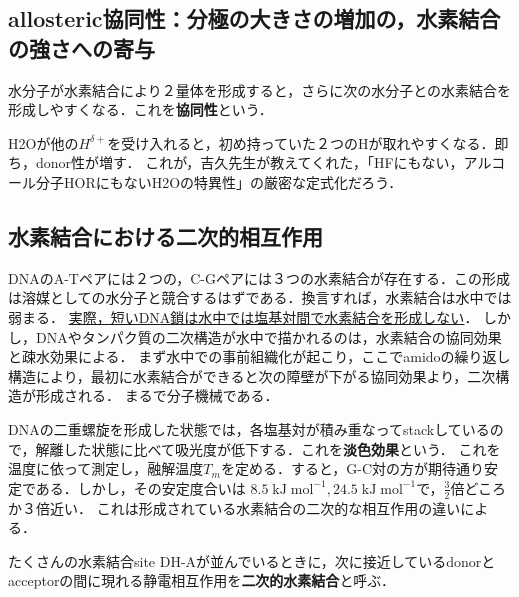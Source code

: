 \documentclass[uplatex, dvipdfmx]{jsreport}
\begin{document}
\subsection{allosteric協同性：分極の大きさの増加の，水素結合の強さへの寄与}

\begin{definition}[cooperaticity]
    水分子が水素結合により２量体を形成すると，さらに次の水分子との水素結合を形成しやすくなる．これを\textbf{協同性}という．
\end{definition}
\begin{remark}
    H2Oが他の$H^{\delta+}$を受け入れると，初め持っていた２つのHが取れやすくなる．即ち，donor性が増す．
    これが，吉久先生が教えてくれた，「HFにもない，アルコール分子HORにもないH2Oの特異性」の厳密な定式化だろう．
\end{remark}

\subsection{水素結合における二次的相互作用}

\begin{example}
    DNAのA-Tペアには２つの，C-Gペアには３つの水素結合が存在する．この形成は溶媒としての水分子と競合するはずである．換言すれば，水素結合は水中では弱まる．
    \underline{実際，短いDNA鎖は水中では塩基対間で水素結合を形成しない}．
    しかし，DNAやタンパク質の二次構造が水中で描かれるのは，水素結合の協同効果と疎水効果による．
    まず水中での事前組織化が起こり，ここでamidoの繰り返し構造により，最初に水素結合ができると次の障壁が下がる協同効果より，二次構造が形成される．
    まるで分子機械である．
\end{example}
\begin{method}
    DNAの二重螺旋を形成した状態では，各塩基対が積み重なってstackしているので，解離した状態に比べて吸光度が低下する．これを\textbf{淡色効果}という．
    これを温度に依って測定し，融解温度$T_m$を定める．すると，G-C対の方が期待通り安定である．しかし，その安定度合いは
    $8.5\;\mathrm{kJ\;mol^{-1}}, 24.5\;\mathrm{kJ\;mol^{-1}}$で，$\frac{3}{2}$倍どころか３倍近い．
    これは形成されている水素結合の二次的な相互作用の違いによる．
\end{method}
\begin{definition}[二次的水素結合]
    たくさんの水素結合site DH-Aが並んでいるときに，次に接近しているdonorとacceptorの間に現れる静電相互作用を\textbf{二次的水素結合}と呼ぶ．
\end{definition}
\end{document}

